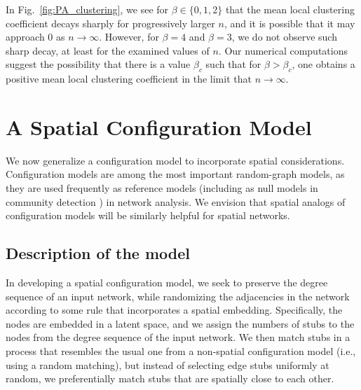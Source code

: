 \documentclass[%
 reprint,
 amsmath,amssymb,
 aps,
]{revtex4-1}
\begin{document}
In Fig.~\ref{fig:PA_clustering}, we see for $\beta \in \{0,1,2\}$ that the mean local clustering coefficient decays sharply for progressively larger $n$, and it is possible that it may approach $0$ as $n \rightarrow\infty$. However, for $\beta=4$ and $\beta=3$, we do not observe such sharp decay, at least for the examined values of $n$. Our numerical computations suggest the possibility that 
there is a value $\beta_c$ such that for $\beta > \beta_c$, one obtains a positive mean local clustering coefficient in the limit that $n \rightarrow \infty$.




\section{A Spatial Configuration Model} \label{sec:configuration_model}

We now generalize a configuration model \cite{fosdick, newman2018} to incorporate spatial considerations. Configuration models are among the most important random-graph models, as they are used frequently as reference models (including as null models in community detection \cite{community1, community2}) in network analysis. We envision that spatial analogs of configuration models will be similarly helpful for spatial networks.


\subsection{Description of the model}

In developing a spatial configuration model, we seek to preserve the degree sequence of an input network, while randomizing the adjacencies in the network according to some rule that incorporates a spatial embedding. Specifically, the nodes are embedded in a latent space, and we assign the numbers of stubs to the nodes from the degree sequence of the input network. We then match stubs in a process that resembles the usual one from a non-spatial configuration model \cite{fosdick} (i.e., using a random matching), but instead of selecting edge stubs uniformly at random, we preferentially match stubs that are spatially close to each other.

\end{document}
